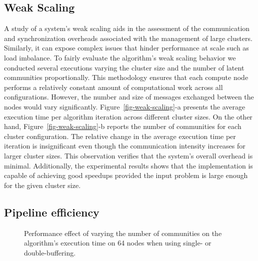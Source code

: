 \subsection{Weak Scaling}

\begin{figure*}[t] %
  \centering
  \caption{(a) Average execution time per algorithm iteration varying
  the number of latent communities proportionally to the number of compute
  nodes. (b) The exact number of communities used for each data point in (a).}
  \label{fig-weak-scaling}
\end{figure*}

A study of a system's weak scaling aids in the assessment of the communication
and synchronization overheads associated with the management of large clusters.
Similarly, it can expose complex issues that hinder performance at scale such
as load imbalance. To fairly evaluate the algorithm's weak scaling behavior we
conducted several executions varying the cluster size and the number of latent
communities proportionally. This methodology ensures that each compute node
performs a relatively constant amount of computational work across all
configurations. However, the number and size of messages exchanged between the
nodes would vary significantly. Figure~\ref{fig-weak-scaling}-a presents the
average execution
time per algorithm iteration across different cluster sizes. On the other hand,
Figure~\ref{fig-weak-scaling}-b reports the number of communities for each
cluster configuration. The relative change in the average execution time per
iteration is insignificant even though the communication intensity increases
for larger cluster sizes. This observation verifies that the system's overall
overhead is minimal. Additionally, the experimental results shows that the
implementation is capable of achieving good speedups provided the input problem
is large enough for the given cluster size.

\subsection{Pipeline efficiency}
\label{eval-pipeline}

\begin{figure}[t] %
  \centering
  \caption{Performance effect of varying the number of communities on the
    algorithm's execution time on 64 nodes when using single- or
    double-buffering.}
  \label{fig-pipeline}
\end{figure}

